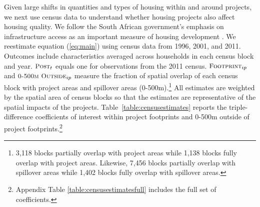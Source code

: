\documentclass[12pt]{article}
\begin{document}
Given large shifts in quantities and types of housing within and around projects, we next use census data to understand whether housing projects also affect housing quality.  We follow the South African government's emphasis on infrastructure access as an important measure of housing development \citep{housingact}.  We reestimate equation (\ref{eq:main}) using census data from 1996, 2001, and 2011.  Outcomes include characteristics averaged across households in each census block and year.  $\textsc{\small Post}_{t}$ equals one for observations from the 2011 census.  $\textsc{\small Footprint}_{ip}$ and $\textsc{\small 0-500m Outside}_{ip}$ measure the fraction of spatial overlap of each census block with project areas and spillover areas (0-500m).\footnote{3,118 blocks partially overlap with project areas while 1,138 blocks fully overlap with project areas.  Likewise, 7,456 blocks partially overlap with spillover areas while 1,402 blocks fully overlap with spillover areas.}  All estimates are weighted by the spatial area of census blocks so that the estimates are representative of the spatial impacts of the projects.  Table~\ref{table:censusestimates} reports the triple-difference coefficients of interest within project footprints and 0-500m outside of project footprints.\footnote{Appendix Table \ref{table:censusestimatesfull} includes the full set of coefficients.}
\end{document}
